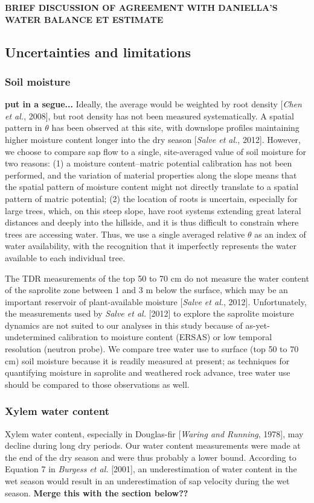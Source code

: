 \textbf{BRIEF DISCUSSION OF AGREEMENT WITH DANIELLA'S WATER BALANCE ET ESTIMATE}

\subsection{Uncertainties and limitations}

\subsubsection{Soil moisture}
\textbf{put in a segue...}
Ideally, the average would be weighted by root density [\textit{Chen et al.}, 2008], but root density has not been measured systematically.  A spatial pattern in $\theta$ has been observed at this site, with downslope profiles maintaining higher moisture content longer into the dry season [\textit{Salve et al.}, 2012].  However, we choose to compare sap flow to a single, site-averaged value of soil moisture for two reasons: (1) a moisture content--matric potential calibration has not been performed, and the variation of material properties along the slope means that the spatial pattern of moisture content might not directly translate to a spatial pattern of matric potential; (2) the location of roots is uncertain, especially for large trees, which, on this steep slope, have root systems extending great lateral distances and deeply into the hillside, and it is thus difficult to constrain where trees are accessing water.  Thus, we use a single averaged relative $\theta$ as an index of water availability, with the recognition that it imperfectly represents the water available to each individual tree.

The TDR measurements of the top 50 to 70 cm do not measure the water content of the saprolite zone between 1 and 3 m below the surface, which may be an important reservoir of plant-available moisture [\textit{Salve et al.}, 2012].  Unfortunately, the measurements used by \textit{Salve et al.} [2012] to explore the saprolite moisture dynamics are not suited to our analyses in this study because of as-yet-undetermined calibration to moisture content (ERSAS) or low temporal resolution (neutron probe).  We compare tree water use to surface (top 50 to 70 cm) soil moisture because it is readily measured at present; as techniques for quantifying moisture in saprolite and weathered rock advance, tree water use should be compared to those observations as well.

\subsubsection{Xylem water content}
Xylem water content, especially in Douglas-fir [\textit{Waring and Running}, 1978], may decline during long dry periods.  Our water content measurements were made at the end of the dry season and were thus probably a lower bound.  According to Equation 7 in \textit{Burgess et al.} [2001], an underestimation of water content in the wet season would result in an underestimation of sap velocity during the wet season.  \textbf{Merge this with the section below??}

